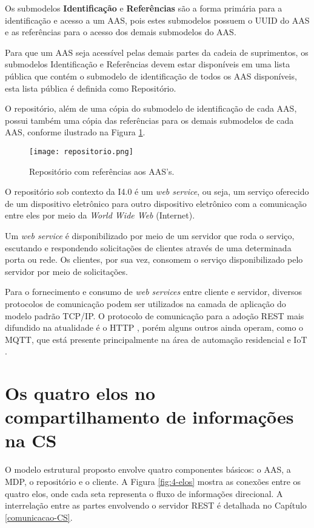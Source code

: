 	Os submodelos \textbf{Identificação} e \textbf{Referências} são a forma primária para a identificação e acesso a um AAS, pois estes submodelos possuem o UUID do AAS e as referências para o acesso dos demais submodelos do AAS.
	
	Para que um AAS seja acessível pelas demais partes da cadeia de suprimentos, os submodelos Identificação e Referências devem estar disponíveis em uma lista pública que contém o submodelo de identificação de todos os AAS disponíveis, esta lista pública é definida como Repositório.
	
	O repositório, além de uma cópia do submodelo de identificação de cada AAS, possui também uma cópia das referências para os demais submodelos de cada AAS, conforme ilustrado na Figura \ref{fig:repositorio}.
	
	
	\begin{figure}[H]
		\centering
		\caption{Repositório com referências aos AAS's.}
		\texttt{[image: repositorio.png]}
		\label{fig:repositorio}
	\end{figure}
	
	O repositório sob contexto da I4.0 é um \textit{web service}, ou seja, um serviço oferecido de um dispositivo eletrônico para outro dispositivo eletrônico com a comunicação entre eles por meio da \textit{World Wide Web} (Internet).
	
	Um \textit{web service} é disponibilizado por meio de um servidor que roda o serviço, escutando e respondendo solicitações de clientes através de uma determinada porta ou rede. Os clientes, por sua vez, consomem o serviço disponibilizado pelo servidor por meio de solicitações.
	
	Para o fornecimento e consumo de \textit{web services} entre cliente e servidor, diversos protocolos de comunicação podem ser utilizados na camada de aplicação do modelo padrão TCP/IP. O protocolo de comunicação para a adoção REST mais difundido na atualidade é o HTTP \cite{gruner2016restful}, porém alguns outros ainda operam, como o MQTT, que está presente principalmente na área de automação residencial e IoT \cite{yokotani2016mqtt}.
	
	
\section{Os quatro elos no compartilhamento de informações na CS}
	
	O modelo estrutural proposto envolve quatro componentes básicos: o AAS, a MDP, o repositório e o cliente. A Figura \ref{fig:4-elos} mostra as conexões entre os quatro elos, onde cada seta representa o fluxo de informações direcional. A interrelação entre as partes envolvendo o servidor REST é detalhada no Capítulo \ref{comunicacao-CS}.
	
